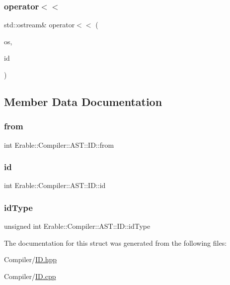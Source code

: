 \subsubsection{\texorpdfstring{operator$<$$<$}{operator<<}}
{\footnotesize\ttfamily std\+::ostream\& operator$<$$<$ (\begin{DoxyParamCaption}\item[{std\+::ostream \&}]{os,  }\item[{const \mbox{\hyperlink{struct_erable_1_1_compiler_1_1_a_s_t_1_1_i_d}{ID}} \&}]{id }\end{DoxyParamCaption})\hspace{0.3cm}{\ttfamily [friend]}}



\subsection{Member Data Documentation}
\mbox{\label{struct_erable_1_1_compiler_1_1_a_s_t_1_1_i_d_a671b6243056d15bdbf67813af4ec1170}} 
\subsubsection{\texorpdfstring{from}{from}}
{\footnotesize\ttfamily int Erable\+::\+Compiler\+::\+A\+S\+T\+::\+I\+D\+::from}

\mbox{\label{struct_erable_1_1_compiler_1_1_a_s_t_1_1_i_d_a78f638fbb291e7243ab45e6846620043}} 
\subsubsection{\texorpdfstring{id}{id}}
{\footnotesize\ttfamily int Erable\+::\+Compiler\+::\+A\+S\+T\+::\+I\+D\+::id}

\mbox{\label{struct_erable_1_1_compiler_1_1_a_s_t_1_1_i_d_a747fe3b9ebea1c222c7e93e734ff7d33}} 
\subsubsection{\texorpdfstring{idType}{idType}}
{\footnotesize\ttfamily unsigned int Erable\+::\+Compiler\+::\+A\+S\+T\+::\+I\+D\+::id\+Type}



The documentation for this struct was generated from the following files\+:\begin{DoxyCompactItemize}
\item 
Compiler/\mbox{\hyperlink{_i_d_8hpp}{I\+D.\+hpp}}\item 
Compiler/\mbox{\hyperlink{_i_d_8cpp}{I\+D.\+cpp}}\end{DoxyCompactItemize}
